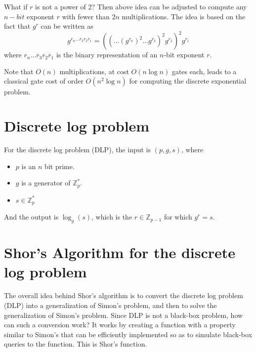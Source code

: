 What if $r$ is not a power of 2? Then above idea can be adjusted to compute any $n-bit$ exponent $r$ with fewer than $2n$ multiplications. The idea is based on the fact that $g^r$ can be written as
\[
g^{r_n\ldots r_3r_2r_1}=((\ldots(g^{r_n})^2 \ldots g^{r_3})^2g^{r_2})^2g^{r_1}
\]
where $r_n\ldots r_3r_2r_1$ is the binary representation of an $n$-bit exponent $r$.

Note that $O(n)$ multiplications, at cost $O(n\log n)$ gates each, leads to a classical gate cost of order $O(n^2 \log n)$ for computing the discrete exponential problem.

\section{Discrete log problem}
For the discrete log problem (DLP), the input is $(p,g,s)$, where
\begin{itemize}
    \item $p$ is an $n$ bit prime.
    \item $g$ is a generator of $\mathbb{Z}_p^*$.
    \item $s \in \mathbb{Z}_p^*$
\end{itemize}
And the output is $\log_g(s)$, which is the $r \in \mathbb{Z}_{p-1}$ for which $g^r=s$.

\section{Shor's Algorithm for the discrete log problem}
The overall idea behind Shor's algorithm is to convert the discrete log problem (DLP) into a generalization of Simon's problem, and then to solve the generalization of Simon's problem. Since DLP is not a black-box problem, how can such a conversion work? It works by creating a function with a property similar to Simon's that can be efficiently implemented so as to simulate black-box queries to the function. This is Shor's function.

